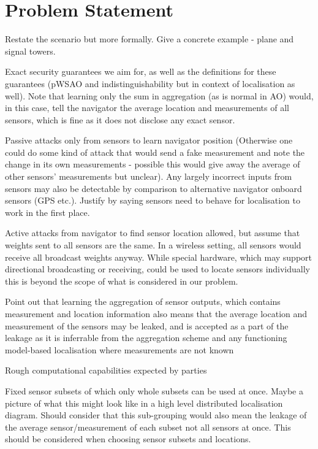 \documentclass[twocolumn]{autart}    %
\begin{document}
\section{Problem Statement}

Restate the scenario but more formally. Give a concrete example - plane and signal towers.

Exact security guarantees we aim for, as well as the definitions for these guarantees (pWSAO and indistinguishability but in context of localisation as well). Note that learning only the sum in aggregation (as is normal in AO) would, in this case, tell the navigator the average location and measurements of all sensors, which is fine as it does not disclose any exact sensor.

Passive attacks only from sensors to learn navigator position (Otherwise one could do some kind of attack that would send a fake measurement and note the change in its own measurements - possible this would give away the average of other sensors' measurements but unclear). Any largely incorrect inputs from sensors may also be detectable by comparison to alternative navigator onboard sensors (GPS etc.). Justify by saying sensors need to behave for localisation to work in the first place.

Active attacks from navigator to find sensor location allowed, but assume that weights sent to all sensors are the same. In a wireless setting, all sensors would receive all broadcast weights anyway. While special hardware, which may support directional broadcasting or receiving, could be used to locate sensors individually this is beyond the scope of what is considered in our problem.

Point out that learning the aggregation of sensor outputs, which contains measurement and location information also means that the average location and measurement of the sensors may be leaked, and is accepted as a part of the leakage as it is inferrable from the aggregation scheme and any functioning model-based localisation where measurements are not known

Rough computational capabilities expected by parties

Fixed sensor subsets of which only whole subsets can be used at once. Maybe a picture of what this might look like in a high level distributed localisation diagram. Should consider that this sub-grouping would also mean the leakage of the average sensor/measurement of each subset not all sensors at once. This should be considered when choosing sensor subsets and locations.
\end{document}
